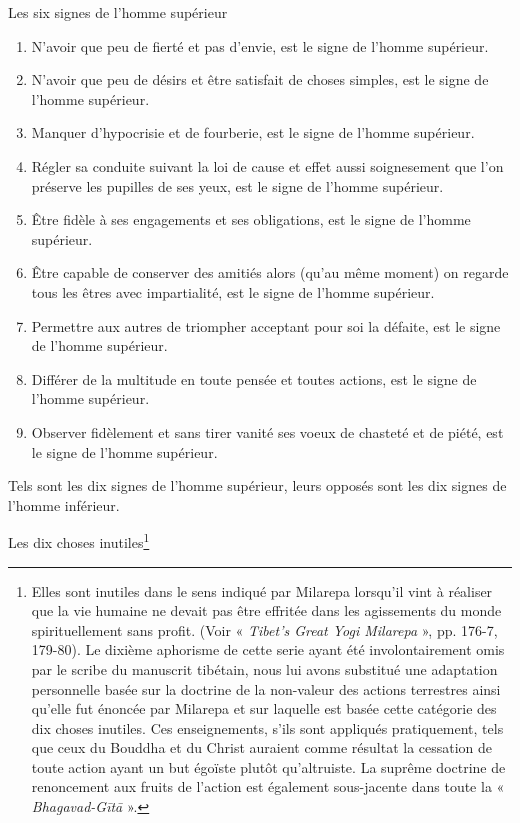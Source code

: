 \documentclass[10pt]{book}
\makeatletter
\renewcommand{\section}{\@startsection{section}{0}{0mm}
   {\baselineskip}
   {\baselineskip}{\normalfont\normalsize\scshape\centering}
}
\makeatother
\begin{document}
\section{Les six signes de l'homme supérieur}
\begin{enumerate}[1.-]
\item N'avoir que peu de fierté et pas d'envie, est le signe de l'homme supérieur.
\item N'avoir que peu de désirs et être satisfait de choses simples, est le signe de l'homme supérieur.
\item Manquer d'hypocrisie et de fourberie, est le signe de l'homme supérieur.
\item Régler sa conduite suivant la loi de cause et effet aussi soignesement que l'on préserve les pupilles de ses yeux, est le signe de l'homme supérieur.
\item Être fidèle à ses engagements et ses obligations, est le signe de l'homme supérieur.
\item Être capable de conserver des amitiés alors (qu'au même moment) on regarde tous les êtres avec impartialité, est le signe de l'homme supérieur.
\item Permettre aux autres de triompher acceptant pour soi la défaite, est le signe de l'homme supérieur.
\item Différer de la multitude en toute pensée et toutes actions, est le signe de l'homme supérieur.
\item Observer fidèlement et sans tirer vanité ses voeux de chasteté et de piété, est le signe de l'homme supérieur.
\end{enumerate}
Tels sont les dix signes de l'homme supérieur, leurs opposés sont les dix signes de l'homme inférieur.

\section{Les dix choses inutiles\footnote{Elles sont inutiles dans le sens indiqué par Milarepa lorsqu'il vint à réaliser que la vie humaine ne devait pas être effritée dans les agissements du monde spirituellement sans profit. (Voir « \textit{Tibet's Great Yogi Milarepa} », pp. 176-7, 179-80). Le dixième aphorisme de cette serie ayant été involontairement omis par le scribe du manuscrit tibétain, nous lui avons substitué une adaptation personnelle basée sur la doctrine de la non-valeur des actions terrestres ainsi qu'elle fut énoncée par Milarepa et sur laquelle est basée cette catégorie des dix choses inutiles. Ces enseignements, s'ils sont appliqués pratiquement, tels que ceux du Bouddha et du Christ auraient comme résultat la cessation de toute action ayant un but égoïste plutôt qu'altruiste. La suprême doctrine de renoncement aux fruits de l'action est également sous-jacente dans toute la « \textit{Bhagavad-Gītā} ».}}
\end{document}
